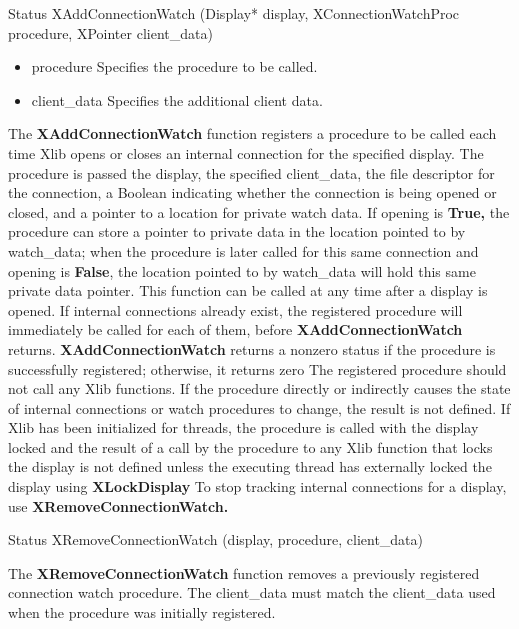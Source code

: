 \documentclass{report}
\begin{document}
\begin{itemize}
\begin{cppcode}
                Status XAddConnectionWatch (Display* display, XConnectionWatchProc procedure, XPointer client_data)
            \end{cppcode}
            \begin{itemize}
                \item procedure Specifies the procedure to be called.
                \item client\_data Specifies the additional client data.
            \end{itemize}
            The \textbf{XAddConnectionWatch} function registers a procedure to be called each time Xlib opens or closes an internal connection for the specified display. The procedure is passed the display, the specified client\_data, the file descriptor for the connection, a Boolean indicating whether the connection is being opened or closed, and a pointer to a location for private watch data. If opening is \textbf{True,} the procedure can store a pointer to private data in the location pointed to by watch\_data; when the procedure is later called for this same connection and opening is \textbf{False}, the location pointed to by watch\_data will hold this same private data pointer.
            \bigbreak \noindent 
            This function can be called at any time after a display is opened. If internal connections already exist, the registered procedure will immediately be called for each of them, before \textbf{XAddConnectionWatch} returns. \textbf{XAddConnectionWatch} returns a nonzero status if the procedure is successfully registered; otherwise, it returns zero
            \bigbreak \noindent 
            The registered procedure should not call any Xlib functions. If the procedure directly or indirectly causes the state of internal connections or watch procedures to change, the result is not defined. If Xlib has been initialized for threads, the procedure is called with the display locked and the result of a call by the procedure to any Xlib function that locks the display is not defined unless the executing thread has externally locked the display using \textbf{XLockDisplay}
            \bigbreak \noindent 
            To stop tracking internal connections for a display, use \textbf{XRemoveConnectionWatch.}
            \bigbreak \noindent 
            \begin{cppcode}
                Status XRemoveConnectionWatch (display, procedure, client_data)
            \end{cppcode}
            \bigbreak \noindent 
            The \textbf{XRemoveConnectionWatch} function removes a previously registered connection watch procedure. The client\_data must match the client\_data used when the procedure was initially registered.

\end{itemize}
\end{document}
